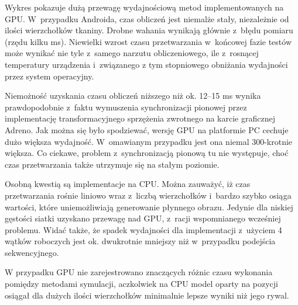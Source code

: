 		Wykres pokazuje dużą przewagę wydajnościową metod implementowanych na GPU. W~przypadku Androida, czas obliczeń jest niemalże stały, niezależnie od ilości wierzchołków tkaniny. Drobne wahania wynikają głównie z~błędu pomiaru (rzędu kilku ms). Niewielki wzrost czasu przetwarzania w~końcowej fazie testów może wynikać nie tyle z~samego narzutu obliczeniowego, ile z~rosnącej temperatury urządzenia i~związanego z tym stopniowego obniżania wydajności przez system operacyjny. 
		
		Niemożność uzyskania czasu obliczeń niższego niż ok. 12--15 ms wynika prawdopodobnie z~faktu wymuszenia synchronizacji pionowej przez implementację transformacyjnego sprzężenia zwrotnego na karcie graficznej Adreno. Jak można się było spodziewać, wersję GPU na platformie PC cechuje dużo większa wydajność. W~omawianym przypadku jest ona niemal 300-krotnie większa. Co ciekawe, problem z~synchronizacją pionową tu nie występuje, choć czas przetwarzania także utrzymuje się na stałym poziomie. 
		
		Osobną kwestią są implementacje na CPU. Można zauważyć, iż czas przetwarzania rośnie liniowo wraz z~liczbą wierzchołków i~bardzo szybko osiąga wartości, które uniemożliwiają generowanie płynnego obrazu. Jedynie dla niskiej gęstości siatki uzyskano przewagę nad GPU, z~racji wspomnianego wcześniej problemu. Widać także, że spadek wydajności dla implementacji z~użyciem 4 wątków roboczych jest ok. dwukrotnie mniejszy niż w~przypadku podejścia sekwencyjnego.
		
		W przypadku GPU nie zarejestrowano znaczących różnic czasu wykonania pomiędzy metodami symulacji, aczkolwiek na CPU model oparty na pozycji osiągał dla dużych ilości wierzchołków minimalnie lepsze wyniki niż jego rywal.
		
		
		
		
		
		
